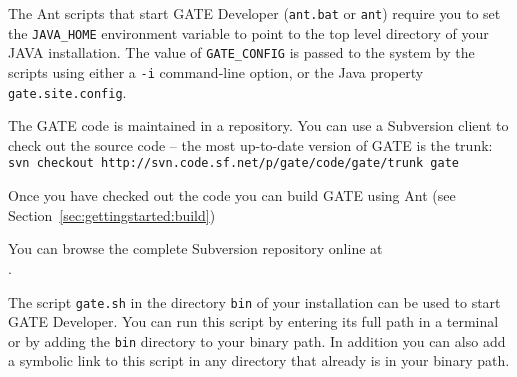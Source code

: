 The Ant scripts that start GATE Developer ({\tt ant.bat} or {\tt ant})
require you to set the {\tt JAVA\_HOME} environment variable to point to the
top level directory of your JAVA installation.
%
The value of {\tt GATE\_CONFIG} is passed to the system by the scripts using
either a {\tt -i} command-line option, or the Java property {\tt
gate.site.config}.



The GATE code is maintained in a
 repository.  You can use
a Subversion client to check out the source code -- the most up-to-date version
of GATE is the trunk:
\\
{\tt svn checkout http://svn.code.sf.net/p/gate/code/gate/trunk gate}

Once you have checked out the code you can build GATE using Ant (see
Section~\ref{sec:gettingstarted:build})

You can browse the complete Subversion repository online at\\
.

%
The script \verb|gate.sh| in the directory \verb|bin| of your installation
can be used to start GATE Developer. You can run this script by entering
its full path in a terminal or by adding the \verb|bin| directory to your 
binary path. In addition you can also add a symbolic link to this script 
in any directory that already is in your binary path.

